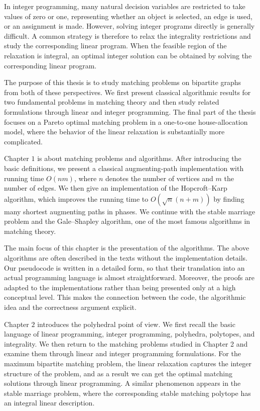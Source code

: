 \documentclass[12pt]{report}
\numberwithin{algorithm}{chapter}
\begin{document}
	In integer programming, many natural decision variables are restricted to take values of zero or one, representing whether an object is selected, an edge is used, or an assignment is made. However, solving integer programs directly is generally difficult. A common strategy is therefore to relax the integrality restrictions and study the corresponding linear program. When the feasible region of the relaxation is integral, an optimal integer solution can be obtained by solving the corresponding linear program.
	
	The purpose of this thesis is to study matching problems on bipartite graphs from both of these perspectives. We first present classical algorithmic results for two fundamental problems in matching theory and then study related formulations through linear and integer programming. The final part of the thesis focuses on a Pareto optimal matching problem in a one-to-one house-allocation model, where the behavior of the linear relaxation is substantially more complicated.
	
	Chapter $1$ is about matching problems and algorithms. After introducing the basic definitions, we present a classical augmenting-path implementation with running time $O(nm)$, where $n$ denotes the number of vertices and $m$ the number of edges. We then give an implementation of the Hopcroft--Karp algorithm, which improves the running time to $O(\sqrt{n}(n + m))$ by finding many shortest augmenting paths in phases. We continue with the stable marriage problem and the Gale--Shapley algorithm, one of the most famous algorithms in matching theory.
	
	The main focus of this chapter is the presentation of the algorithms. The above algorithms are often described in the texts without the implementation details. Our pseudocode is written in a detailed form, so that their translation into an actual programming language is almost straightforward. Moreover, the proofs are adapted to the implementations rather than being presented only at a high conceptual level. This makes the connection between the code, the algorithmic idea and the correctness argument explicit.
	
	Chapter $2$ introduces the polyhedral point of view. We first recall the basic language of linear programming, integer programming, polyhedra, polytopes, and integrality. We then return to the matching problems studied in Chapter 2 and examine them through linear and integer programming formulations. For the maximum bipartite matching problem, the linear relaxation captures the integer structure of the problem, and as a result we can get the optimal matching solutions through linear programming. A similar phenomenon appears in the stable marriage problem, where the corresponding stable matching polytope has an integral linear description. 
	
\end{document}
